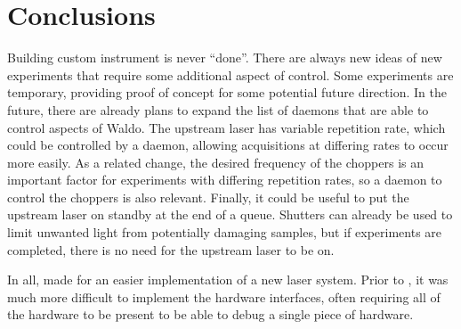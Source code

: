 \clearpage

\section{Conclusions}  %

Building custom instrument is never ``done''.
There are always new ideas of new experiments that require some additional aspect of control.
Some experiments are temporary, providing proof of concept for some potential future direction.
In the future, there are already plans to expand the list of daemons that are able to control aspects of Waldo.
The upstream laser has variable repetition rate, which could be controlled by a daemon, allowing acquisitions at differing rates to occur more easily.
As a related change, the desired frequency of the choppers is an important factor for experiments with differing repetition rates, so a daemon to control the choppers is also relevant.
Finally, it could be useful to put the upstream laser on standby at the end of a queue.
Shutters can already be used to limit unwanted light from potentially damaging samples, but if experiments are completed, there is no need for the upstream laser to be on.

In all, \yaq{} made for an easier implementation of a new laser system.
Prior to \yaq{}, it was much more difficult to implement the hardware interfaces, often requiring all of the hardware to be present to be able to debug a single piece of hardware.

\clearpage
